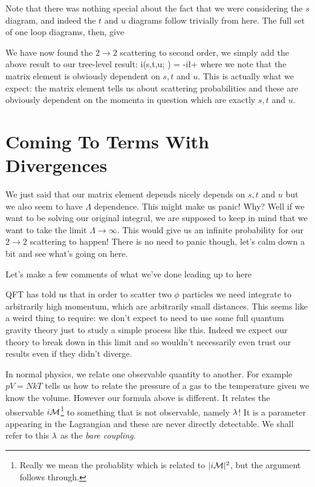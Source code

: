 Note that there was nothing special about the fact that we were considering the $s$ diagram, and indeed the $t$ and $u$ diagrams follow trivially from here. The full set of one loop diagrams, then, give 

We have now found the $2\to 2$ scattering to second order, we simply add the above result to our tree-level result:
\be 
\label{eqn:iMOneLoop}
    i\cM(s,t,u; \Lambda) = -i\l +  
\ee 
where we note that the matrix element is obviously dependent on $s,t$ and $u$. This is actually what we expect: the matrix element tells us about scattering probabilities and these are obviously dependent on the momenta in question which are exactly $s,t$ and $u$.

\section{Coming To Terms With Divergences}

We just said that our matrix element depends nicely depends on $s,t$ and $u$ but we also seem to have $\Lambda$ dependence. This might make us panic! Why? Well if we want to be solving our original integral, we are supposed to keep in mind that we want to take the limit $\Lambda\to\infty$. This would give us an infinite probability for our $2\to 2$ scattering to happen! There is no need to panic though, let's calm down a bit and see what's going on here. 

Let's make a few comments of what we've done leading up to here
\ben 
    \item QFT has told us that in order to scatter two $\phi$ particles we need integrate to arbitrarily high momentum, which are arbitrarily small distances. This seems like a weird thing to require: we don't expect to need to use some full quantum gravity theory just to study a simple process like this. Indeed we expect our theory to break down in this limit and so wouldn't necessarily even trust our results even if they didn't diverge. 
    \item In normal physics, we relate one observable quantity to another. For example $pV=NkT$ tells us how to relate the pressure of a gas to the temperature given we know the volume. However our formula above is different. It relates the observable $i\mathcal{M}$\footnote{Really we mean the probablity which is related to $|i\mathcal{M}|^2$, but the argument follows through.} to something that is not observable, namely $\lambda$! It is a parameter appearing in the Lagrangian and these are never directly detectable. We shall refer to this $\lambda$ as the \textit{bare coupling}. 
\een     
    
